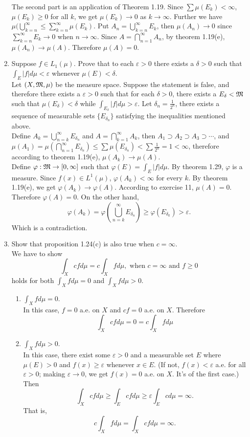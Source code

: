 \documentclass{article}
\begin{document}
\begin{enumerate}
 	The second part is an application of Theorem 1.19.  Since $\sum\mu(E_k)<\infty$, $\mu(E_k) \geq 0$ for all $k$, we get $\mu(E_k) \to 0$ as $k \to \infty$. Further we have $\mu(\bigcup_{k=n}^{\infty} \leq \sum_{k=n}^{\infty}\mu(E_k)$. Put $A_n = \bigcup_{k=n}^{\infty}E_k$, then $\mu(A_n) \to 0$ since $\sum_{k=n}^{\infty}E_k \to 0$ when $n \to \infty$. Since $A = \bigcap_{n=1}^{\infty}A_n$, by theorem 1.19(e), $\mu(A_n) \to \mu(A)$. Therefore $\mu(A)=0$.
 	\item \exercise Suppose $f\in L_1(\mu)$. Prove that to each $\varepsilon>0$ there exists a $\delta>0$ such that $\int_E|f|d\mu<\varepsilon$ whenever $\mu(E)<\delta$.\\
 	\solution Let $(X,\mathfrak{M},\mu)$ be the measure space. Suppose the statement is false, and therefore there exists a $\varepsilon>0$ such that for each $\delta>0$, there exists a $E_\delta<\mathfrak{M}$ such that $\mu(E_\delta)<\delta$ while $\int_{E_\delta}|f|d\mu>\varepsilon$. Let $\delta_n=\frac{1}{2^n}$, there exists a sequence of measurable sets $\{E_{\delta_n}\}$ satisfying the inequalities mentioned above.\\
 	Define $A_k=\bigcup_{n=k}^{\infty}E_{\delta_n}$ and $A=\bigcap_{k=1}^{\infty}A_k$, then $A_1\supset A_2\supset A_3\supset\cdots$, and $\mu(A_1)=\mu(\bigcap_{n=1}^{\infty}E_{\delta_n})\leq\sum\mu(E_{\delta_n})<\sum\frac{1}{2^n}=1<\infty$, therefore according to theorem 1.19(e), $\mu(A_k)\to\mu(A)$.\\
 	Define $\varphi:\mathfrak{M}\to[0,\infty]$ such that $\varphi(E)=\int_{E}|f|d\mu$. By theorem 1.29, $\varphi$ is a measure. Since $f(x)\in{L^1(\mu)}$, $\varphi(A_k)<\infty$ for every $k$. By theorem 1.19(e), we get $\varphi(A_k)\to\varphi(A)$. According to exercise 11, $\mu(A)=0$. Therefore $\varphi(A)=0$. On the other hand,
 	\[
 		\varphi(A_k)=\varphi(\bigcup_{n=k}^{\infty}E_{\delta_n})\geq\varphi(E_{\delta_k})>\varepsilon.
 	\]
	Which is a contradiction.
 	\item \exercise Show that proposition 1.24(c) is also true when $c=\infty$.\\
 	\solution We have to show
 	\[
 		\int_Xcfd\mu=c\int_{X}fd\mu,\text{ when }c=\infty\text{ and }f\geq0
 	\]
 	holds for both $\int_{X}fd\mu=0$ and $\int_{X}fd\mu>0$.
 	\begin{enumerate}
 		\item $\int_{X}fd\mu=0$.\\
 		
 		In this case, $f=0$ a.e. on $X$ and $cf=0$ a.e. on $X$. Therefore
 		\[
 			\int_{X}cfd\mu=0=c\int_{X}fd\mu
 		\]
 		\item $\int_{X}fd\mu>0$.\\
 		
 		In this case, there exist some $\varepsilon>0$ and a measurable set $E$ where $\mu(E)>0$ and $f(x)\geq\varepsilon$ whenever $x\in{E}$. (If not, $f(x)<\varepsilon$ a.e. for all $\varepsilon>0$; making $\varepsilon\to0$, we get $f(x)=0$ a.e. on $X$. It's of the first case.) Then
 		\[
 			\int_{X}cfd\mu\geq\int_{E}cfd\mu\geq\varepsilon\int_{E}cd\mu=\infty.
 		\]
 		That is,
 		\[
 			c\int_{X}fd\mu=\int_{X}cfd\mu=\infty.
 		\]
 	\end{enumerate}
\end{enumerate}
\end{document}
